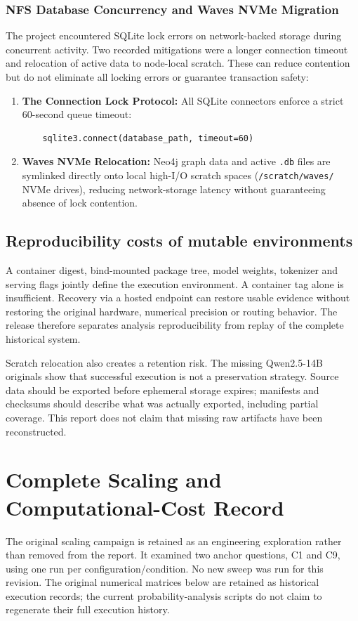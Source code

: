\subsubsection{NFS Database Concurrency and Waves NVMe Migration}
The project encountered SQLite lock errors on network-backed storage during concurrent activity. Two recorded mitigations were a longer connection timeout and relocation of active data to node-local scratch. These can reduce contention but do not eliminate all locking errors or guarantee transaction safety:
\begin{enumerate}
    \item \textbf{The Connection Lock Protocol:} All SQLite connectors enforce a strict 60-second queue timeout:
    \begin{verbatim}
    sqlite3.connect(database_path, timeout=60)
    \end{verbatim}
    \item \textbf{Waves NVMe Relocation:} Neo4j graph data and active \texttt{.db} files are symlinked directly onto local high-I/O scratch spaces (\texttt{/scratch/waves/} NVMe drives), reducing network-storage latency without guaranteeing absence of lock contention.
\end{enumerate}



\subsection{Reproducibility costs of mutable environments}
A container digest, bind-mounted package tree, model weights, tokenizer and serving flags jointly define the execution environment. A container tag alone is insufficient. Recovery via a hosted endpoint can restore usable evidence without restoring the original hardware, numerical precision or routing behavior. The release therefore separates analysis reproducibility from replay of the complete historical system.

Scratch relocation also creates a retention risk. The missing Qwen2.5-14B originals show that successful execution is not a preservation strategy. Source data should be exported before ephemeral storage expires; manifests and checksums should describe what was actually exported, including partial coverage. This report does not claim that missing raw artifacts have been reconstructed.



\section{Complete Scaling and Computational-Cost Record}
\label{sec:results}
The original scaling campaign is retained as an engineering exploration rather than removed from the report. It examined two anchor questions, C1 and C9, using one run per configuration/condition. No new sweep was run for this revision. The original numerical matrices below are retained as historical execution records; the current probability-analysis scripts do not claim to regenerate their full execution history.

